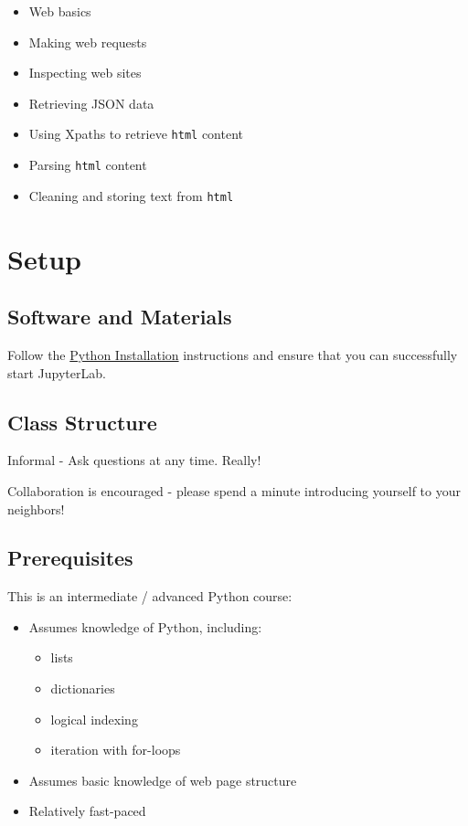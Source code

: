 \documentclass[
]{book}
\providecommand{\tightlist}{%
  \setlength{\itemsep}{0pt}\setlength{\parskip}{0pt}}
\begin{document}
\begin{itemize}
\tightlist
\item
  Web basics
\item
  Making web requests
\item
  Inspecting web sites
\item
  Retrieving JSON data
\item
  Using Xpaths to retrieve \texttt{html} content
\item
  Parsing \texttt{html} content
\item
  Cleaning and storing text from \texttt{html}
\end{itemize}

\hypertarget{setup-5}{%
\section{Setup}\label{setup-5}}

\hypertarget{software-and-materials-5}{%
\subsection{Software and Materials}\label{software-and-materials-5}}

Follow the \href{./PythonInstall.html}{Python Installation} instructions and ensure that you can successfully start JupyterLab.

\hypertarget{class-structure-5}{%
\subsection{Class Structure}\label{class-structure-5}}

Informal - Ask questions at any time. Really!

Collaboration is encouraged - please spend a minute introducing yourself to your neighbors!

\hypertarget{prerequisites-5}{%
\subsection{Prerequisites}\label{prerequisites-5}}

This is an intermediate / advanced Python course:

\begin{itemize}
\tightlist
\item
  Assumes knowledge of Python, including:

  \begin{itemize}
  \tightlist
  \item
    lists
  \item
    dictionaries
  \item
    logical indexing
  \item
    iteration with for-loops
  \end{itemize}
\item
  Assumes basic knowledge of web page structure
\item
  Relatively fast-paced
\end{itemize}
\end{document}
